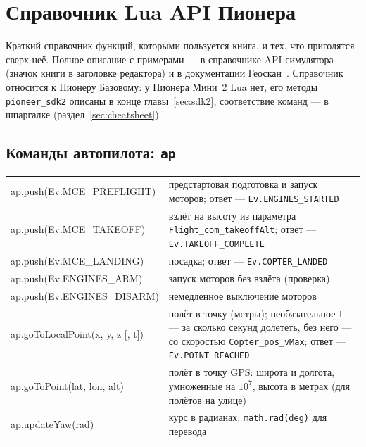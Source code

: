 \section{Справочник Lua API Пионера}
\label{sec:lua-api}

Краткий справочник функций, которыми пользуется книга, и тех, что пригодятся сверх неё. Полное описание с примерами --- в справочнике API симулятора (значок книги в заголовке редактора) и в документации Геоскан~\cite{geoscan_lua}. Справочник относится к Пионеру Базовому: у Пионера Мини~2 Lua нет, его методы \texttt{pioneer\_sdk2} описаны в конце главы~\ref{sec:sdk2}, соответствие команд --- в шпаргалке (раздел~\ref{sec:cheatsheet}).

\subsection{Команды автопилота: \texttt{ap}}
\begin{center}\small
\begin{tabularx}{\linewidth}{@{}>{\ttfamily}l X@{}}
\toprule
ap.push(Ev.MCE\_PREFLIGHT) & предстартовая подготовка и запуск моторов; ответ --- \texttt{Ev.ENGINES\_STARTED} \\
ap.push(Ev.MCE\_TAKEOFF) & взлёт на высоту из параметра \texttt{Flight\_com\_takeoffAlt}; ответ --- \texttt{Ev.TAKEOFF\_COMPLETE} \\
ap.push(Ev.MCE\_LANDING) & посадка; ответ --- \texttt{Ev.COPTER\_LANDED} \\
ap.push(Ev.ENGINES\_ARM) & запуск моторов без взлёта (проверка) \\
ap.push(Ev.ENGINES\_DISARM) & немедленное выключение моторов \\
ap.goToLocalPoint(x, y, z [, t]) & полёт в точку (метры); необязательное \texttt{t} --- за сколько секунд долететь, без него --- со скоростью \texttt{Copter\_pos\_vMax}; ответ --- \texttt{Ev.POINT\_REACHED} \\
ap.goToPoint(lat, lon, alt) & полёт в точку GPS: широта и долгота, умноженные на $10^7$, высота в метрах (для полётов на улице) \\
ap.updateYaw(rad) & курс в радианах; \texttt{math.rad(deg)} для перевода \\
\bottomrule
\end{tabularx}
\end{center}


